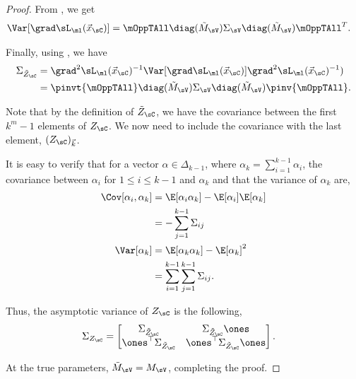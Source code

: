 \begin{proof}
  From , we get
  \begin{align*}
    \Var [\grad \sL_\ml(\vec x_\sC)] &= \mOppTAll \diag(\tilde M_\sV) \Sigma_\sV \diag(\tilde M_\sV) \mOppTAll^T .
  \end{align*}

  Finally, using , we have
  \begin{align*}
    \Sigma_{\tilde Z_\sC} 
      &= \grad^2 \sL_\ml(\vec x_\sC)^{-1} \Var [\grad \sL_\ml(\vec x_\sC)] \grad^2 \sL_\ml(\vec x_\sC)^{-1}) \\
      &= \pinvt{\mOppTAll} \diag(\tilde M_\sV) \Sigma_\sV \diag(\tilde M_\sV) \pinv{\mOppTAll}.
  \end{align*}

Note that by the definition of $\tilde Z_\sC$, we have the covariance
between the first $k^m - 1$ elements of $Z_\sC$. 
We now need to include the covariance with the last element,
  $(Z_\sC)_{\vec k}$. 

It is easy to verify that for a vector $\alpha \in \Delta_{k-1}$, where
  $\alpha_k = \sum_{i=1}^{k-1} \alpha_i$, the covariance between
  $\alpha_i$ for $1 \le i \le k-1$ and $\alpha_k$ and that the variance
  of $\alpha_k$ are,
\begin{align*}
  \Cov[ \alpha_i, \alpha_k ] 
    &= \E[ \alpha_i \alpha_k ] - \E[ \alpha_i ]\E[ \alpha_k ] \\ 
    &= - \sum_{j=1}^{k-1} \Sigma_{ij} \\
  \Var[ \alpha_k ] 
    &= \E[ \alpha_k \alpha_k ] - \E[ \alpha_k ]^2 \\ 
    &= \sum_{i=1}^{k-1} \sum_{j=1}^{k-1} \Sigma_{ij}.
\end{align*}

Thus, the asymptotic variance of $Z_\sC$ is the following,
\begin{align*}
    \Sigma_{Z_\sC} &= 
    \begin{bmatrix}
    \Sigma_{\tilde Z_\sC} & \Sigma_{\tilde Z_\sC} \ones \\
    \ones^\top \Sigma_{\tilde Z_\sC} & \ones^\top \Sigma_{\tilde Z_\sC} \ones
    \end{bmatrix}.
\end{align*}



  At the true parameters, $\tilde M_\sV = M_\sV$, completing the proof.
\end{proof}

